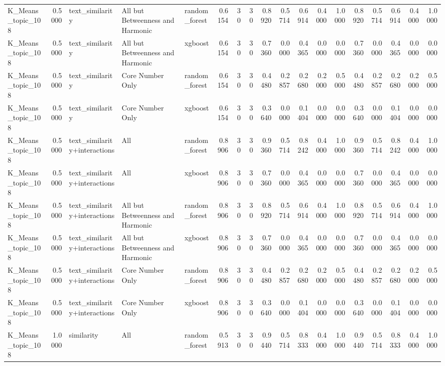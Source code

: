 \begin{tabular}{lrlllrrrrrrrrrrrrr}
K_Means_topic_108 & 0.5000 & text_similarity & All but Betweenness and Harmonic & random_forest & 0.6154 & 30 & 30 & 0.8920 & 0.5714 & 0.6914 & 0.4000 & 1.0000 & 0.8920 & 0.5714 & 0.6914 & 0.4000 & 1.0000 \\
K_Means_topic_108 & 0.5000 & text_similarity & All but Betweenness and Harmonic & xgboost & 0.6154 & 30 & 30 & 0.7360 & 0.0000 & 0.4365 & 0.0000 & 0.0000 & 0.7360 & 0.0000 & 0.4365 & 0.0000 & 0.0000 \\
K_Means_topic_108 & 0.5000 & text_similarity & Core Number Only & random_forest & 0.6154 & 30 & 30 & 0.4480 & 0.2857 & 0.2680 & 0.2000 & 0.5000 & 0.4480 & 0.2857 & 0.2680 & 0.2000 & 0.5000 \\
K_Means_topic_108 & 0.5000 & text_similarity & Core Number Only & xgboost & 0.6154 & 30 & 30 & 0.3640 & 0.0000 & 0.1404 & 0.0000 & 0.0000 & 0.3640 & 0.0000 & 0.1404 & 0.0000 & 0.0000 \\
K_Means_topic_108 & 0.5000 & text_similarity+interactions & All & random_forest & 0.8906 & 30 & 30 & 0.9360 & 0.5714 & 0.8242 & 0.4000 & 1.0000 & 0.9360 & 0.5714 & 0.8242 & 0.4000 & 1.0000 \\
K_Means_topic_108 & 0.5000 & text_similarity+interactions & All & xgboost & 0.8906 & 30 & 30 & 0.7360 & 0.0000 & 0.4365 & 0.0000 & 0.0000 & 0.7360 & 0.0000 & 0.4365 & 0.0000 & 0.0000 \\
K_Means_topic_108 & 0.5000 & text_similarity+interactions & All but Betweenness and Harmonic & random_forest & 0.8906 & 30 & 30 & 0.8920 & 0.5714 & 0.6914 & 0.4000 & 1.0000 & 0.8920 & 0.5714 & 0.6914 & 0.4000 & 1.0000 \\
K_Means_topic_108 & 0.5000 & text_similarity+interactions & All but Betweenness and Harmonic & xgboost & 0.8906 & 30 & 30 & 0.7360 & 0.0000 & 0.4365 & 0.0000 & 0.0000 & 0.7360 & 0.0000 & 0.4365 & 0.0000 & 0.0000 \\
K_Means_topic_108 & 0.5000 & text_similarity+interactions & Core Number Only & random_forest & 0.8906 & 30 & 30 & 0.4480 & 0.2857 & 0.2680 & 0.2000 & 0.5000 & 0.4480 & 0.2857 & 0.2680 & 0.2000 & 0.5000 \\
K_Means_topic_108 & 0.5000 & text_similarity+interactions & Core Number Only & xgboost & 0.8906 & 30 & 30 & 0.3640 & 0.0000 & 0.1404 & 0.0000 & 0.0000 & 0.3640 & 0.0000 & 0.1404 & 0.0000 & 0.0000 \\
K_Means_topic_108 & 1.0000 & similarity & All & random_forest & 0.5913 & 30 & 30 & 0.9440 & 0.5714 & 0.8333 & 0.4000 & 1.0000 & 0.9440 & 0.5714 & 0.8333 & 0.4000 & 1.0000 \\

\end{tabular}
